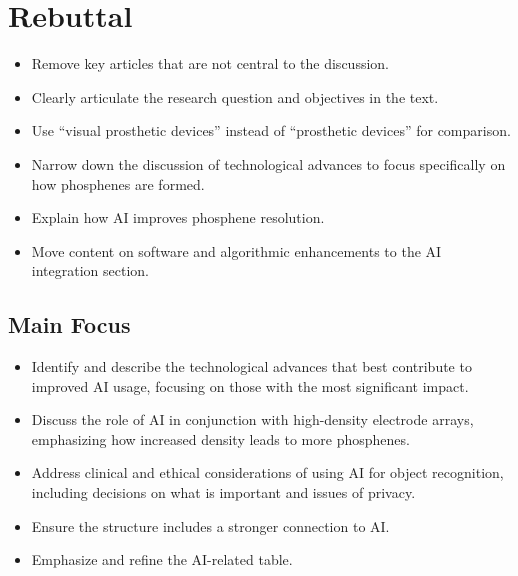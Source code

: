 \documentclass[twocolumn,10pt]{article}
\begin{document}
\section*{Rebuttal}\label{sec:rebuttal}
\begin{itemize}
      \item Remove key articles that are not central to the discussion.
      \item Clearly articulate the research question and objectives in the text.
      \item Use ``visual prosthetic devices'' instead of ``prosthetic devices'' for comparison.
      \item Narrow down the discussion of technological advances to focus specifically on how phosphenes are formed.
      \item Explain how AI improves phosphene resolution.
      \item Move content on software and algorithmic enhancements to the AI integration section.
\end{itemize}

\subsection*{Main Focus}
\begin{itemize}
      \item Identify and describe the technological advances that best contribute to improved AI usage, focusing on those with the most significant impact.
      \item Discuss the role of AI in conjunction with high-density electrode arrays, emphasizing how increased density leads to more phosphenes.
      \item Address clinical and ethical considerations of using AI for object recognition, including decisions on what is important and issues of privacy.
      \item Ensure the structure includes a stronger connection to AI.\@
      \item Emphasize and refine the AI-related table.
\end{itemize}
\end{document}
